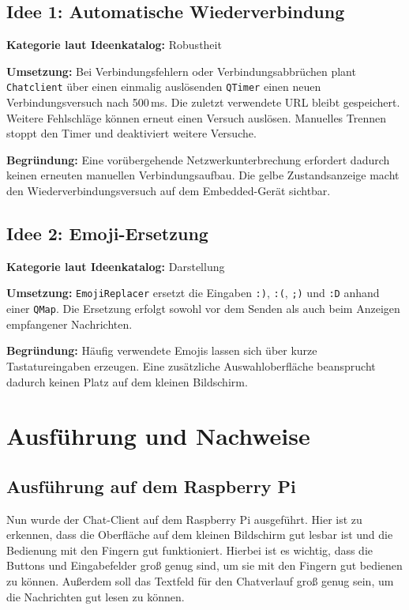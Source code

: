 \subsection{Idee 1: Automatische Wiederverbindung}
\textbf{Kategorie laut Ideenkatalog:} Robustheit

\textbf{Umsetzung:} Bei Verbindungsfehlern oder Verbindungsabbrüchen plant
\texttt{Chatclient} über einen einmalig auslösenden \texttt{QTimer} einen
neuen Verbindungsversuch nach 500\,ms. Die zuletzt verwendete URL bleibt
gespeichert. Weitere Fehlschläge können erneut einen Versuch auslösen.
Manuelles Trennen stoppt den Timer und deaktiviert weitere Versuche.

\textbf{Begründung:} Eine vorübergehende Netzwerkunterbrechung erfordert
dadurch keinen erneuten manuellen Verbindungsaufbau. Die gelbe Zustandsanzeige
macht den Wiederverbindungsversuch auf dem Embedded-Gerät sichtbar.

\newpage
\subsection{Idee 2: Emoji-Ersetzung}
\textbf{Kategorie laut Ideenkatalog:} Darstellung

\textbf{Umsetzung:} \texttt{EmojiReplacer} ersetzt die Eingaben
\texttt{:)}, \texttt{:(}, \texttt{;)} und \texttt{:D} anhand einer
\texttt{QMap}. Die Ersetzung erfolgt sowohl vor dem Senden als auch beim
Anzeigen empfangener Nachrichten.

\textbf{Begründung:} Häufig verwendete Emojis lassen sich über kurze
Tastatureingaben erzeugen. Eine zusätzliche Auswahloberfläche beansprucht
dadurch keinen Platz auf dem kleinen Bildschirm.

\newpage
\section{Ausführung und Nachweise}

\subsection{Ausführung auf dem Raspberry Pi}

Nun wurde der Chat-Client auf dem Raspberry Pi ausgeführt.
Hier ist zu erkennen, dass die Oberfläche auf dem kleinen Bildschirm gut lesbar ist und die Bedienung mit den Fingern gut funktioniert.
Hierbei ist es wichtig, dass die Buttons und Eingabefelder groß genug sind, um sie mit den Fingern gut bedienen zu können.
Außerdem soll das Textfeld für den Chatverlauf groß genug sein, um die Nachrichten gut lesen zu können.

